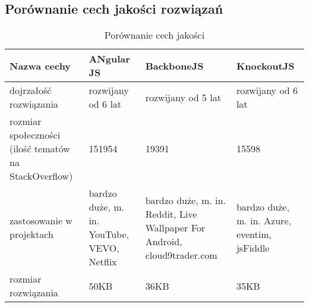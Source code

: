 \subsection{Porównanie cech jakości rozwiązań}
 \begin{table}[h]
	\caption{Porównanie cech jakości}
	\label{tab:heading-styles}
	\begin{tabularx}{\textwidth}{|X|X|X|X|}
		\hline
		Nazwa cechy						& ANgular JS 	&  BackboneJS & KnockoutJS	\\ 
		\hline
		dojrzałość rozwiązania 		& rozwijany od 6 lat & rozwijany od 5 lat & rozwijany od 6 lat 	\\  
		\hline
		rozmiar społeczności (ilość tematów na StackOverflow)				& 151954 & 19391 & 15598 \\ 
		\hline
		zastosowanie w projektach			& bardzo duże, m. in. YouTube, VEVO, Netflix & bardzo duże, m. in. Reddit, Live Wallpaper For Android, cloud9trader.com  & bardzo duże, m. in. Azure, eventim, jsFiddle \\ 
		\hline
		rozmiar rozwiązania					& 50KB  & 36KB & 35KB\\
		\hline
	\end{tabularx}
\end{table}
